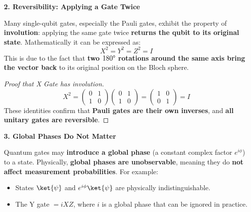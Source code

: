 \highspace
\begin{flushleft}
    \textcolor{Green3}{\textbf{2. Reversibility: Applying a Gate Twice}}
\end{flushleft}
Many single-qubit gates, especially the Pauli gates, exhibit the property of \textbf{involution}: applying the same gate twice \textbf{returns the qubit to its original state}. Mathematically it can be expressed as:
\begin{equation*}
    X^{2} = Y^{2} = Z^{2} = I
\end{equation*}
This is due to the fact that \textbf{two $180\degree$ rotations around the same axis bring the vector back} to its original position on the Bloch sphere.

\begin{proof}[Proof that X Gate has involution]
    \begin{equation*}
        X^{2} =
        \begin{pmatrix}
            0 & 1 \\ 1 & 0
        \end{pmatrix}
        \begin{pmatrix}
            0 & 1 \\ 1 & 0
        \end{pmatrix}
        =
        \begin{pmatrix}
            1 & 0 \\ 0 & 1
        \end{pmatrix}
        =
        I
    \end{equation*}
    These identities confirm that \textbf{Pauli gates are their own inverses}, and \textbf{all unitary gates are reversible}.
\end{proof}

\highspace
\begin{flushleft}
    \textcolor{Green3}{\textbf{3. Global Phases Do Not Matter}}
\end{flushleft}
Quantum gates may \textbf{introduce a global phase} (a constant complex factor $e^{i\phi}$) to a state. Physically, \textbf{global phases are unobservable}, meaning they do \textbf{not affect measurement probabilities}. For example:
\begin{itemize}
    \item States $\ket{\psi}$ and $e^{i\phi}\ket{\psi}$ are physically indistinguishable.
    \item The Y gate $= iXZ$, where $i$ is a global phase that can be ignored in practice. 
\end{itemize}

